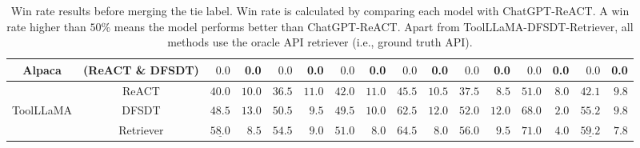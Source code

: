 \begin{table}[!t]
{\begin{tabular}{ccrrrrrrrrrrrrrr}
    Alpaca & (ReACT \& DFSDT) & $0.0$ & 0.0 & $0.0$ & 0.0 & $0.0$ & 0.0 & $0.0$ & 0.0 & $0.0$ & 0.0 & $0.0$ & 0.0 & $0.0$ & 0.0  \\
    \midrule
     & ReACT & $40.0$ & $10.0$ & $36.5$ & $11.0$ & $42.0$ & $11.0$ & $45.5$ & $10.5$ & $37.5$ & $8.5$ & $51.0$ & $8.0$ & $42.1$ & $9.8$\\
     ToolLLaMA & DFSDT & $48.5$ & $13.0$ & $50.5$ & $9.5$ & $49.5$ & $10.0$ & $62.5$ & $12.0$ & $52.0$ & $12.0$ & $68.0$ & $2.0$ & $55.2$ & $9.8$ \\
      & Retriever & $\underline{58.0}$ & $8.5$ & $54.5$ & $9.0$ & $51.0$ & $8.0$ & $64.5$ & $8.0$ & $56.0$ & $9.5$ & $71.0$ & $4.0$ & $\underline{59.2}$ & $7.8$ \\
    
    \bottomrule
    \end{tabular}%
    }
    \caption{
    \small{Win rate results before merging the tie label. Win rate is calculated by comparing each model with ChatGPT-ReACT. A win rate higher than $50\%$ means the model performs better than ChatGPT-ReACT. Apart from ToolLLaMA-DFSDT-Retriever, all methods use the oracle API retriever (i.e., ground truth API).
    }
    }
    \label{tab:main_exp_all}
    \end{table}




